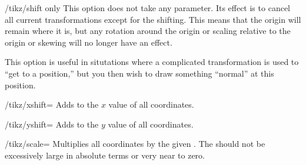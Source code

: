 \begin{key}{/tikz/shift only}
  This option does not take any parameter. Its effect is to cancel all
  current transformations except for the shifting. This means that the
  origin will remain where it is, but any rotation around the origin
  or scaling relative to the origin or skewing will no longer have an
  effect.

  This option is useful in situtations where a complicated
  transformation is used to ``get to a position,'' but you then wish
  to draw something ``normal'' at this position. 

\begin{codeexample}[]
\end{codeexample}
\end{key}

\begin{key}{/tikz/xshift=}
  Adds  to the $x$ value of all coordinates.  
\begin{codeexample}[]
\end{codeexample}
\end{key}

\begin{key}{/tikz/yshift=}
  Adds  to the $y$ value of all coordinates.
\end{key}

\begin{key}{/tikz/scale=}
  Multiplies all coordinates by the given . The
   should not be excessively large in absolute terms or
  very near to zero.
\begin{codeexample}[]
\end{codeexample}
\end{key}

